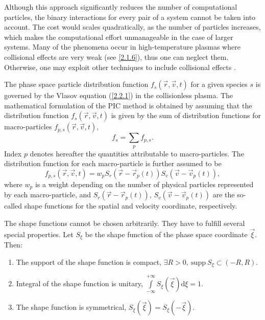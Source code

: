 Although this approach significantly reduces the number of computational particles, the binary interactions for every pair of a system cannot be taken into account. The cost would scales quadratically, as the number of particles increases, which makes the computational effort unmanageable in the case of larger systems. Many of the phenomena occur in high-temperature plasmas where collisional effects are very weak (see \ref{2.1.6}), thus one can neglect them. Otherwise, one may exploit other techniques to include collisional effects \cite{lapenta}.

The phase space particle distribution function  $ f_{s} \left(\vec{r}, \vec{v}, t\right) $ for a given species $ s $ is governed by the Vlasov equation (\ref{2.2.1}) in the collisionless plasma. The mathematical formulation of the PIC method is obtained by assuming that the distribution function $ f_{s} \left(\vec{r}, \vec{v}, t\right) $ is given by the sum of distribution functions for macro-particles $ f_{p, s} \left(\vec{r}, \vec{v}, t\right) $,
\begin{equation}
\label{3.1.1}
f_{s} =  \sum_{p} f_{p, s}.
\end{equation}
Index $ p $ denotes hereafter the quantities attributable to macro-particles. The distribution function for each macro-particle is further assumed to be
\begin{equation}
\label{3.1.2}
f_{p, s}\left(\vec{r}, \vec{v}, t \right) = w_{p} S_{r}\left(\vec{r} - \vec{r}_{p}\left(t\right) \right)  S_{v}\left(\vec{v} - \vec{v}_{p}\left( t\right) \right),
\end{equation}
where $ w_{p} $ is a weight depending on the number of physical particles represented by each macro-particle, and $ S_{r}\left(\vec{r} - \vec{r}_{p}\left(t\right) \right) $, $ S_{v}\left(\vec{v} - \vec{v}_{p}\left(t\right) \right) $ are the so-called shape functions for the spatial and velocity coordinate, respectively.

The shape functions cannot be chosen arbitrarily. They have to fulfill several special properties. Let $ S_{\xi} $ be the shape function of the phase space coordinate $ \vec{\xi} $. Then:
\begin{enumerate}[nolistsep, topsep=5pt]
\item The support of the shape function is compact, $ \exists R > 0, \: \mathrm{supp} \: S_{\xi} \subset \left(-R, R\right) $.
\item Integral of the shape function is unitary, $ \int\limits_{-\infty}^{+\infty} S_{\xi}\left(\vec{\xi}\right)  \mathrm{d} \xi = 1 $.
\item The shape function is symmetrical, $ S_{\xi}\left(\vec{\xi}\right) = S_{\xi}\left(-\vec{\xi}\right) $.
\end{enumerate}

